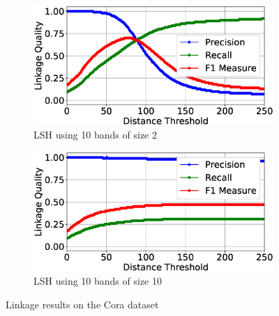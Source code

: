 \documentclass{llncs}
\begin{document}
\begin{figure}
\begin{subfigure}{.5\textwidth}
  \centering
\includegraphics[width=\textwidth]{figures/plotLQ-cora-lsh-10-2}
\vspace{-6mm}
\caption{LSH using 10 bands of size 2}
\end{subfigure}%
\begin{subfigure}{.5\textwidth}
  \centering
\includegraphics[width=\textwidth]{figures/plotLQ-cora-lsh-10-10}
\vspace{-6mm}
\caption{LSH using 10 bands of size 10}
\end{subfigure}

\caption{Linkage results on the Cora dataset}
\label{cora-quality}
\end{figure}

\end{document}
